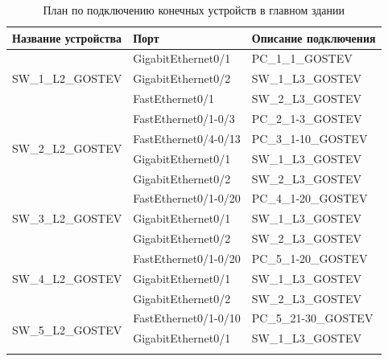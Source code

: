\documentclass[14pt, a4paper]{extarticle}
\numberwithin{equation}{section}
\begin{document}
\begin{table}[H]
\small
\centering
\caption{План по подключению конечных устройств в главном здании}
\begin{tabular}{|l|l|l|}
\hline
\textbf{Название устройства}        & \textbf{Порт}            & \textbf{Описание подключения} \\ \hline
\multirow{3}{*}{SW\_1\_L2\_GOSTEV}  & GigabitEthernet0/1       & PC\_1\_1\_GOSTEV              \\ \cline{2-3} 
                                    & GigabitEthernet0/2       & SW\_1\_L3\_GOSTEV             \\ \cline{2-3} 
                                    & FastEthernet0/1          & SW\_2\_L3\_GOSTEV             \\ \hline
\multirow{4}{*}{SW\_2\_L2\_GOSTEV}  & FastEthernet0/1-0/3      & PC\_2\_1-3\_GOSTEV            \\ \cline{2-3} 
                                    & FastEthernet0/4-0/13     & PC\_3\_1-10\_GOSTEV           \\ \cline{2-3} 
                                    & GigabitEthernet0/1       & SW\_1\_L3\_GOSTEV             \\ \cline{2-3} 
                                    & GigabitEthernet0/2       & SW\_2\_L3\_GOSTEV             \\ \hline
\multirow{3}{*}{SW\_3\_L2\_GOSTEV}  & FastEthernet0/1-0/20     & PC\_4\_1-20\_GOSTEV           \\ \cline{2-3} 
                                    & GigabitEthernet0/1       & SW\_1\_L3\_GOSTEV             \\ \cline{2-3} 
                                    & GigabitEthernet0/2       & SW\_2\_L3\_GOSTEV             \\ \hline
\multirow{3}{*}{SW\_4\_L2\_GOSTEV}  & FastEthernet0/1-0/20     & PC\_5\_1-20\_GOSTEV           \\ \cline{2-3} 
                                    & GigabitEthernet0/1       & SW\_1\_L3\_GOSTEV             \\ \cline{2-3} 
                                    & GigabitEthernet0/2       & SW\_2\_L3\_GOSTEV             \\ \hline
\multirow{3}{*}{SW\_5\_L2\_GOSTEV}  & FastEthernet0/1-0/10     & PC\_5\_21-30\_GOSTEV          \\ \cline{2-3} 
                                    & GigabitEthernet0/1       & SW\_1\_L3\_GOSTEV             \\ \cline{2-3} 

\end{tabular}
\end{table}
\end{document}
